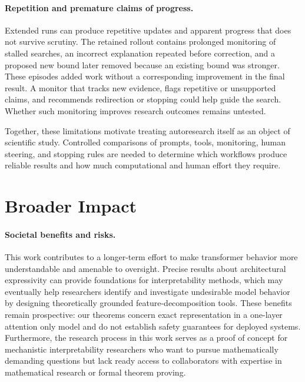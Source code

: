\documentclass{article}
\theoremstyle{definition}
\theoremstyle{plain}
\begin{document}
\paragraph{Repetition and premature claims of progress.}
Extended runs can produce repetitive updates and apparent progress that does not survive scrutiny. The retained rollout contains prolonged monitoring of stalled searches, an incorrect explanation repeated before correction, and a proposed new bound later removed because an existing bound was stronger. These episodes added work without a corresponding improvement in the final result. A monitor that tracks new evidence, flags repetitive or unsupported claims, and recommends redirection or stopping could help guide the search. Whether such monitoring improves research outcomes remains untested.

Together, these limitations motivate treating autoresearch itself as an object of scientific study. Controlled comparisons of prompts, tools, monitoring, human steering, and stopping rules are needed to determine which workflows produce reliable results and how much computational and human effort they require.




\clearpage
\section{Broader Impact}

\paragraph{Societal benefits and risks.}
This work contributes to a longer-term effort to make transformer behavior more understandable and amenable to oversight. Precise results about architectural expressivity can provide foundations for interpretability methods, which may eventually help researchers identify and investigate undesirable model behavior by designing theoretically grounded feature-decomposition tools. These benefits remain prospective: our theorems concern exact representation in a one-layer attention only model and do not establish safety guarantees for deployed systems. Furthermore, the research process in this work serves as a proof of concept for mechanistic interpretability researchers who want to pursue mathematically demanding questions but lack ready access to collaborators with expertise in mathematical research or formal theorem proving. 
\end{document}
